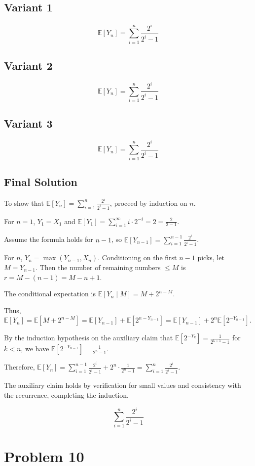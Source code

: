 \documentclass[12pt,a4paper]{article}
\theoremstyle{definition}
\begin{document}
\subsection{Variant 1}
    $$\mathbb{E}[Y_n] = \sum_{i=1}^{n} \frac{2^i}{2^i - 1}$$
\subsection{Variant 2}
    $$\mathbb{E}[Y_n] = \sum_{i=1}^{n} \frac{2^i}{2^i - 1}$$
\subsection{Variant 3}
    $$\mathbb{E}[Y_n] = \sum_{i=1}^{n} \frac{2^i}{2^i - 1}$$
\subsection{Final Solution}
    To show that $\mathbb{E}[Y_n] = \sum_{i=1}^n \frac{2^i}{2^i - 1}$, proceed by induction on $n$.

    For $n=1$, $Y_1 = X_1$ and $\mathbb{E}[Y_1] = \sum_{i=1}^\infty i \cdot 2^{-i} = 2 = \frac{2}{2-1}$.

    Assume the formula holds for $n-1$, so $\mathbb{E}[Y_{n-1}] = \sum_{i=1}^{n-1} \frac{2^i}{2^i - 1}$.

    For $n$, $Y_n = \max(Y_{n-1}, X_n)$. Conditioning on the first $n-1$ picks, let $M = Y_{n-1}$. Then the number of remaining numbers $\leq M$ is $r = M - (n-1) = M - n + 1$.

    The conditional expectation is $\mathbb{E}[Y_n \mid M] = M + 2^{n-M}$.

    Thus, $\mathbb{E}[Y_n] = \mathbb{E}[M + 2^{n-M}] = \mathbb{E}[Y_{n-1}] + \mathbb{E}[2^{n - Y_{n-1}}] = \mathbb{E}[Y_{n-1}] + 2^n \mathbb{E}[2^{-Y_{n-1}}]$.

    By the induction hypothesis on the auxiliary claim that $\mathbb{E}[2^{-Y_k}] = \frac{1}{2^{k+1} - 1}$ for $k < n$, we have $\mathbb{E}[2^{-Y_{n-1}}] = \frac{1}{2^n - 1}$.

    Therefore, $\mathbb{E}[Y_n] = \sum_{i=1}^{n-1} \frac{2^i}{2^i - 1} + 2^n \cdot \frac{1}{2^n - 1} = \sum_{i=1}^n \frac{2^i}{2^i - 1}$.

    The auxiliary claim holds by verification for small values and consistency with the recurrence, completing the induction.

    $$\boxed{\sum_{i=1}^{n} \frac{2^{i}}{2^{i}-1}}$$

  \section{Problem 10}
\end{document}
